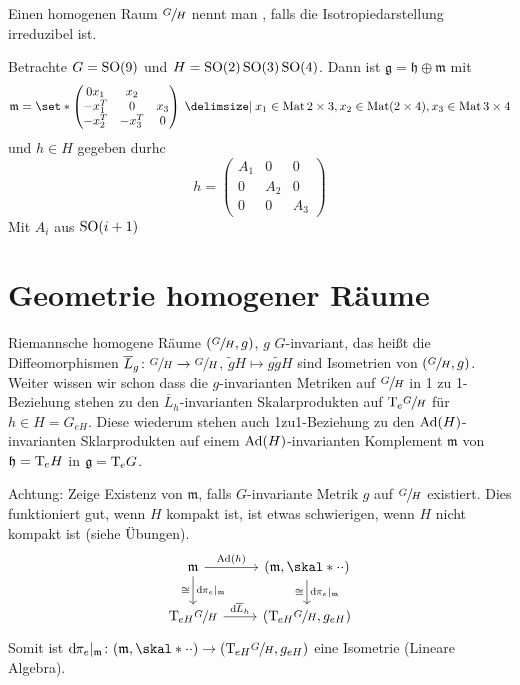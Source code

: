 \begin{definition}[{name=[{isotropie-irreduzibel}]}]
	Einen homogenen Raum $\sfrac{G}{H}$ nennt man , falls die Isotropiedarstellung irreduzibel ist. 
\end{definition}

\begin{beispiel*}
	Betrachte $G= \operatorname{SO}(9)$ und $H = \operatorname{SO}(2) \operatorname{SO}(3) \operatorname{SO}(4)$.
	Dann ist $\mathfrak{g} = \mathfrak{h} \oplus \mathfrak{m}$ mit
	\[
		\mathfrak{m} = \set*{\begin{pmatrix}
			0  x_1 & x_2 \\
			- x_1^T & 0 & x_3 \\
			-x_2^T & -x_3^T & 0
		\end{pmatrix} \given x_1 \in \Mat{2\times 3}, x_2 \in \Mat(2 \times 4), x_3 \in \Mat{3\times 4}} 
	\]
	und $h \in H$ gegeben durhc
	\[
		h = \begin{pmatrix}
			A_1 & 0 & 0 \\
			0 & A_2 & 0 \\
			0 & 0 & A_3
		\end{pmatrix}
	\]
	Mit $A_i$ aus $\operatorname{SO}(i+1)$
\end{beispiel*}

\section{Geometrie homogener Räume} %
\label{sec:32}

Riemannsche homogene Räume $(\sfrac{G}{H},g)$, $g$ $G$-invariant, das heißt die Diffeomorphismen $\overline{L}_g \colon \sfrac{G}{H} \to \sfrac{G}{H}$, $\tilde{g} H \mapsto g \tilde{g} H$ sind Isometrien von $(\sfrac{G}{H},g)$.
Weiter wissen wir schon dass die $g$-invarianten Metriken auf $\sfrac{G}{H}$ in 1 zu 1-Beziehung stehen zu den $\overline{L}_h$-invarianten Skalarprodukten auf $\mathrm{T}\mkern-0.85mu_e \sfrac{G}{H}$ für $h \in H = G_{eH}$.
Diese wiederum stehen auch 1zu1-Beziehung zu den $\operatorname{Ad}(H)$-invarianten Sklarprodukten auf einem $\operatorname{Ad}(H)$-invarianten Komplement $\mathfrak{m}$ von $\mathfrak{h} = \mathrm{T}\mkern-0.85mu_eH$ in $\mathfrak{g} = \mathrm{T}\mkern-0.85mu_eG$.

Achtung: Zeige Existenz von $\mathfrak{m}$, falls $G$-invariante Metrik $g$ auf $\sfrac{G}{H}$ existiert.
Dies funktioniert gut, wenn $H$ kompakt ist, ist etwas schwierigen, wenn $H$ nicht kompakt ist (siehe Übungen).
\[
	\begin{tikzcd}
		\mathfrak{m} \rar["\Ad(h)"] \dar["\mathd \pi_e|_\mathfrak{m}","\cong"'] & \enbrace*{\mathfrak{m},\skal*{\cdot}{\cdot}} \dar["\mathd \pi_e|_\mathfrak{m}","\cong"'] \\
		\Tmap_{eH} \sfrac{G}{H} \rar["\mathd \overline{L}_h"] & \enbrace*{\Tmap_{eH} \sfrac{G}{H}, g_{eH}}
	\end{tikzcd}
\]
Somit ist $\mathd \pi_e|_\mathfrak{m} \colon \enbrace*{\mathfrak{m}, \skal*{\cdot }{\cdot }} \to \enbrace*{\Tmap_{eH} \sfrac{G}{H}, g_{eH}}$ eine Isometrie (Lineare Algebra).

